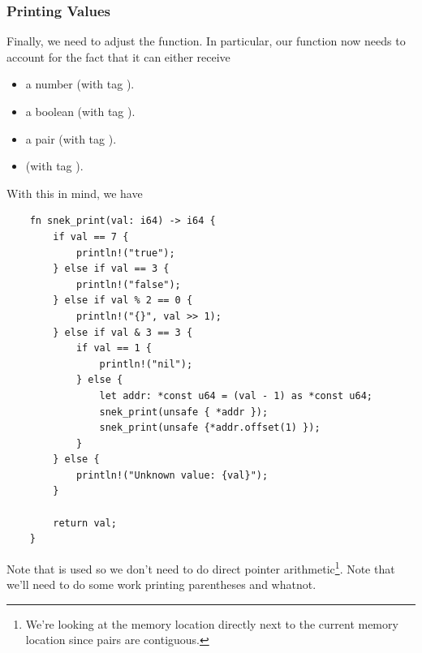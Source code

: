 \documentclass[letterpaper]{article}
\begin{document}
\subsubsection{Printing Values}
Finally, we need to adjust the  function. In particular, our function now needs to account for the fact that it can either receive 
\begin{itemize}
    \item a number (with tag ).
    \item a boolean (with tag ).
    \item a pair (with tag ).
    \item {} (with tag ).
\end{itemize}
With this in mind, we have 
\begin{verbatim}
    fn snek_print(val: i64) -> i64 {
        if val == 7 {
            println!("true");
        } else if val == 3 {
            println!("false");
        } else if val % 2 == 0 {
            println!("{}", val >> 1);
        } else if val & 3 == 3 {
            if val == 1 {
                println!("nil");
            } else {
                let addr: *const u64 = (val - 1) as *const u64; 
                snek_print(unsafe { *addr });
                snek_print(unsafe {*addr.offset(1) });
            }
        } else {
            println!("Unknown value: {val}");
        }

        return val;
    }\end{verbatim}
Note that  is used so we don't need to do direct pointer arithmetic\footnote{We're looking at the memory location directly next to the current memory location since pairs are contiguous.}. Note that we'll need to do some work printing parentheses and whatnot.
\end{document}
